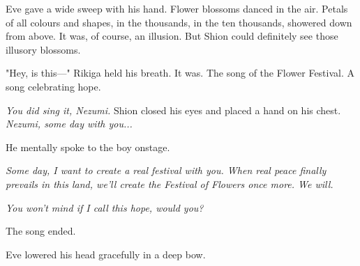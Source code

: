Eve gave a wide sweep with his hand. Flower blossoms danced in the air. Petals of all colours and shapes, in the thousands, in the ten thousands, showered down from above. It was, of course, an illusion. But Shion could definitely see those illusory blossoms.


"Hey, is this---" Rikiga held his breath. It was. The song of the Flower Festival. A song celebrating hope.

\emph{You did sing it, Nezumi.} Shion closed his eyes and placed a hand on his chest. \emph{Nezumi, some day with you...}

He mentally spoke to the boy onstage.

\emph{Some day, I want to create a real festival with you. When real peace finally prevails in this land, we'll create the Festival of Flowers once more. We will.}

\emph{You won't mind if I call this hope, would you?}

The song ended.

Eve lowered his head gracefully in a deep bow.